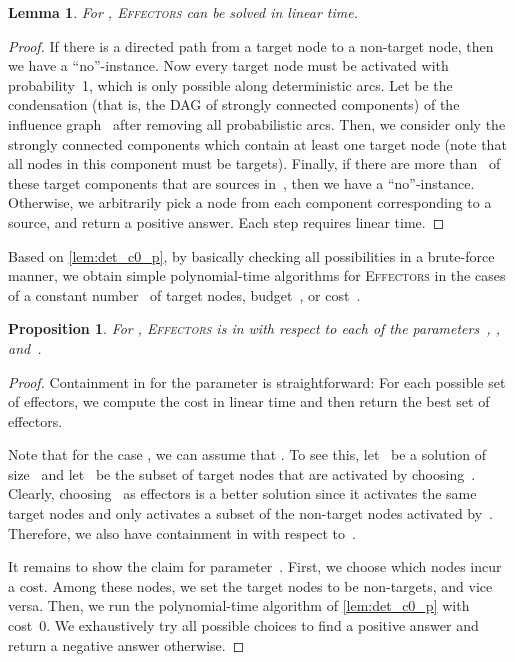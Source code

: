 \documentclass{article}
\newtheorem{lemma}{Lemma}
\newtheorem{proposition}{Proposition}
\newcommand{\probEffectors}{\textsc{Effectors}\xspace}
\begin{document}
\begin{lemma}\label{lem:det_c0_p}
  For , \probEffectors can be solved in linear time.
\end{lemma}

\begin{proof}
  If there is a directed path from a target node to a non-target node,
  then we have a ``no''-instance.
  Now every target node must be activated with probability~1,
  which is only possible along deterministic arcs.
  Let  be the condensation (that is, the DAG of strongly connected
  components) of the influence graph~ after
  removing all probabilistic arcs.
  Then, we consider only the strongly connected components which
  contain at least one target node
  (note that all nodes in this component must be targets).
  Finally, if there are more than~ of these target components that
  are sources in~, then we have a ``no''-instance.
  Otherwise, we arbitrarily pick a node from each component corresponding to a source,
  and return a positive answer.
  Each step requires linear time. 
\end{proof}

\noindent 
Based on \autoref{lem:det_c0_p},
by basically checking all possibilities in a brute-force manner,
we obtain simple polynomial-time algorithms for
\probEffectors in the cases of a constant number~ of target
nodes, budget~, or cost~.

\begin{proposition}\label{prop:generalZEROrXP}
  For , \probEffectors is in  with respect to each of
  the parameters~, , and~.
\end{proposition}

\begin{proof}
  Containment in  for the parameter  is straightforward:
  For each possible set of effectors, we compute the cost in linear time and
  then return the best set of effectors.

  Note that for the case , we can assume that .
  To see this, let~ be a solution of size~ and let~ be the subset of target nodes that are activated by choosing~.
  Clearly, choosing~ as effectors is a better solution since it activates the
  same target nodes and only activates a subset of the non-target nodes activated by~.
  Therefore, we also have containment in  with respect to~.

  It remains to show the claim for parameter~.
  First, we choose which  nodes incur a cost.
  Among these nodes, we set the target nodes to be non-targets, and vice versa.
  Then, we run the polynomial-time algorithm of \autoref{lem:det_c0_p} with cost~0.
  We exhaustively try all possible  choices to find a
  positive answer and return a negative answer otherwise. 
\end{proof}
\end{document}
